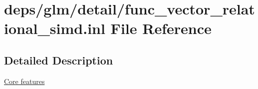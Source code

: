 \hypertarget{func__vector__relational__simd_8inl}{}\section{deps/glm/detail/func\+\_\+vector\+\_\+relational\+\_\+simd.inl File Reference}
\label{func__vector__relational__simd_8inl}


\subsection{Detailed Description}
\hyperlink{group__core}{Core features} 